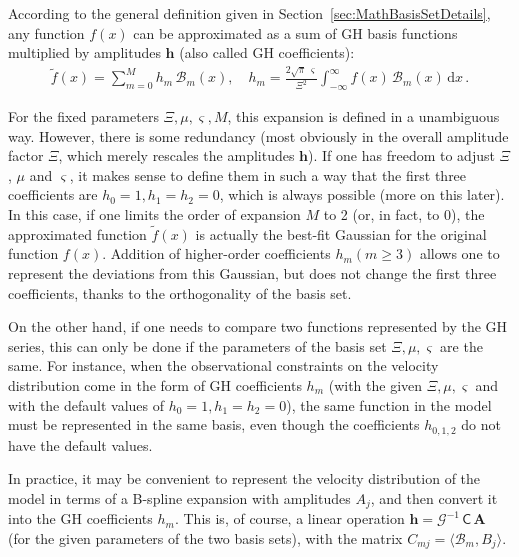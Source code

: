\documentclass[12pt]{article}
\renewcommand{\d}{\mathrm{d}}
\begin{document}
According to the general definition given in Section~\ref{sec:MathBasisSetDetails}, any function $f(x)$ can be approximated as a sum of GH basis functions multiplied by amplitudes $\boldsymbol{h}$ (also called GH coefficients):
\begin{align}  \label{eq:GHcoefs}
\tilde f(x) = \sum_{m=0}^{M} h_m\, \mathcal B_m(x), \quad
h_m = \frac{2\sqrt{\pi}\,\varsigma}{\Xi^2} \int_{-\infty}^{\infty} f(x)\, \mathcal B_m(x)\, \d x \,.
\end{align}

For the fixed parameters $\Xi, \mu, \varsigma, M$, this expansion is defined in a unambiguous way. However, there is some redundancy (most obviously in the overall amplitude factor $\Xi$, which merely rescales the amplitudes $\boldsymbol h$). If one has freedom to adjust $\Xi$, $\mu$ and $\varsigma$, it makes sense to define them in such a way that the first three coefficients are $h_0=1, h_1=h_2=0$, which is always possible (more on this later). In this case, if one limits the order of expansion $M$ to 2 (or, in fact, to 0), the approximated function $\tilde f(x)$ is actually the best-fit Gaussian for the original function $f(x)$. Addition of higher-order coefficients $h_m (m\ge 3)$ allows one to represent the deviations from this Gaussian, but does not change the first three coefficients, thanks to the orthogonality of the basis set.

On the other hand, if one needs to compare two functions represented by the GH series, this can only be done if the parameters of the basis set $\Xi, \mu, \varsigma$ are the same. For instance, when the observational constraints on the velocity distribution come in the form of GH coefficients $h_m$ (with the given $\Xi, \mu, \varsigma$ and with the default values of $h_0=1, h_1=h_2=0$), the same function in the model must be represented in the same basis, even though the coefficients $h_{0,1,2}$ do not have the default values.

In practice, it may be convenient to represent the velocity distribution of the model in terms of a B-spline expansion with amplitudes $A_j$, and then convert it into the GH coefficients $h_m$. This is, of course, a linear operation $\boldsymbol h = \mathcal G^{-1}\, \mathsf C \,\boldsymbol A$ (for the given parameters of the two basis sets), with the matrix $C_{mj} = \langle \mathcal B_m, B_j \rangle$.
\end{document}
